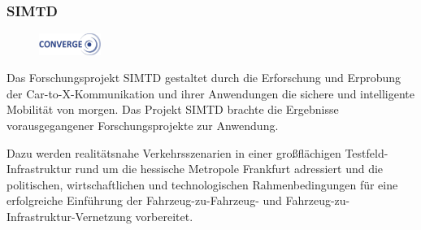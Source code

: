 \subsubsection{\acs{SIMTD}}
\begin{figure}
  \centering
  	 \includegraphics[width=0.18\textwidth]{./content/images/logos/logo-projekte/converge_logo.pdf}
\end{figure}
Das Forschungsprojekt \ac{SIMTD} gestaltet durch die Erforschung und Erprobung der Car-to-X-Kommunikation und ihrer Anwendungen die sichere und intelligente Mobilität von morgen. 
Das Projekt \ac{SIMTD} brachte die Ergebnisse vorausgegangener Forschungsprojekte zur Anwendung. 

Dazu werden realitätsnahe Verkehrsszenarien in einer großflächigen Testfeld-Infrastruktur rund um die hessische Metropole Frankfurt adressiert und die politischen, wirtschaftlichen und technologischen Rahmenbedingungen für eine erfolgreiche Einführung der Fahrzeug-zu-Fahrzeug- und Fahrzeug-zu-Infrastruktur-Vernetzung vorbereitet. \cite{simtd_info}
